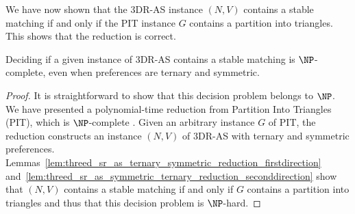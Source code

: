 We have now shown that the 3DR-AS instance $(N, V)$ contains a stable matching if and only if the PIT instance $G$ contains a partition into triangles. This shows that the reduction is correct.

\begin{thm}
\label{thm:threed_sr_as_symmetric_ternary_reduction}
Deciding if a given instance of 3DR-AS contains a stable matching is $\NP$-complete, even when preferences are ternary and symmetric.
\end{thm}
\begin{proof}
It is straightforward to show that this decision problem belongs to $\NP$. We have presented a polynomial-time reduction from Partition Into Triangles (PIT), which is $\NP$-complete \cite{GJ79}. Given an arbitrary instance $G$ of PIT, the reduction constructs an instance $(N, V)$ of 3DR-AS with ternary and symmetric preferences. Lemmas~\ref{lem:threed_sr_as_ternary_symmetric_reduction_firstdirection} and~\ref{lem:threed_sr_as_symmetric_ternary_reduction_seconddirection} show that $(N, V)$ contains a stable matching if and only if $G$ contains a partition into triangles and thus that this decision problem is $\NP$-hard.
\end{proof}
